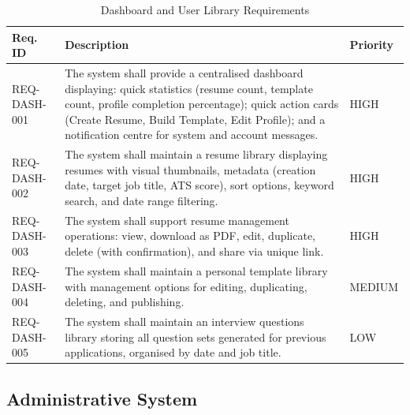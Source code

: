 \documentclass[12pt, a4paper, oneside]{report}
\begin{document}
\begin{table}[H]
\centering
\caption{Dashboard and User Library Requirements}
\label{tab:req_dashboard}
\renewcommand{\arraystretch}{1.5}
\begin{tabularx}{\textwidth}{|p{3cm}|X|p{2cm}|}
\hline
\textbf{Req. ID} & \textbf{Description} & \textbf{Priority} \\
\hline
REQ-DASH-001 & The system shall provide a centralised dashboard displaying: quick statistics (resume count, template count, profile completion percentage); quick action cards (Create Resume, Build Template, Edit Profile); and a notification centre for system and account messages. & HIGH \\
\hline
REQ-DASH-002 & The system shall maintain a resume library displaying resumes with visual thumbnails, metadata (creation date, target job title, ATS score), sort options, keyword search, and date range filtering. & HIGH \\
\hline
REQ-DASH-003 & The system shall support resume management operations: view, download as PDF, edit, duplicate, delete (with confirmation), and share via unique link. & HIGH \\
\hline
REQ-DASH-004 & The system shall maintain a personal template library with management options for editing, duplicating, deleting, and publishing. & MEDIUM \\
\hline
REQ-DASH-005 & The system shall maintain an interview questions library storing all question sets generated for previous applications, organised by date and job title. & LOW \\
\hline
\end{tabularx}
\end{table}

\subsection{Administrative System}
\end{document}
